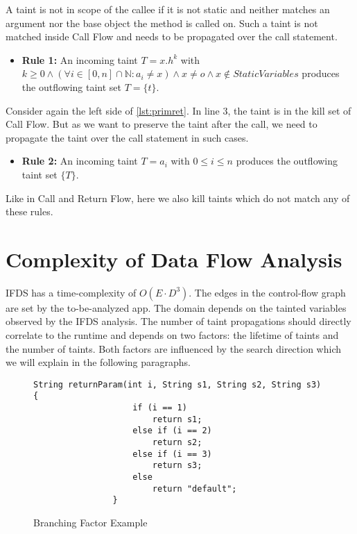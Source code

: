 \documentclass[../draft.tex]{subfiles}
\begin{document}
    A taint is not in scope of the callee if it is not static and neither matches an argument nor the base object the method is called on. Such a taint is not matched inside Call Flow and needs to be propagated over the call statement.
    \begin{itemize}
        \item[] \textbf{Rule 1:} An incoming taint $T = x.h^k$ with $k \geq 0 \land \left(\forall i \in [0, n] \cap \mathbb{N}: a_i \neq x\right) \land x \neq o \land x \notin \mathit{StaticVariables}$ produces the outflowing taint set $T = \{t\}$. 
    \end{itemize}

    Consider again the left side of \autoref{lst:primret}. In line 3, the taint is in the kill set of Call Flow. But as we want to preserve the taint after the call, we need to propagate the taint over the call statement in such cases. 
    \begin{itemize}
        \item[] \textbf{Rule 2:} An incoming taint $T = a_i$ with $0 \leq i \leq n$ produces the outflowing taint set $\{T\}$. 
    \end{itemize}
        
    Like in Call and Return Flow, here we also kill taints which do not match any of these rules.
    
    \section{Complexity of Data Flow Analysis}\label{s:complexity}
    IFDS has a time-complexity of $O(E \cdot D^3)$. The edges in the control-flow graph are set by the to-be-analyzed app. The domain depends on the tainted variables observed by the IFDS analysis. The number of taint propagations should directly correlate to the runtime and depends on two factors: the lifetime of taints and the number of taints. Both factors are influenced by the search direction which we will explain in the following paragraphs.

    \begin{figure}[ht]
        \centering
        \begin{adjustbox}{max width=\textwidth}
            \begin{lstlisting}[gobble=16]
                String returnParam(int i, String s1, String s2, String s3) {
                    if (i == 1)
                        return s1;
                    else if (i == 2)
                        return s2;
                    else if (i == 3)
                        return s3;
                    else
                        return "default";
                }
            \end{lstlisting}    
        \end{adjustbox}
        \caption{Branching Factor Example}
        \label{lst:branching}
    \end{figure}
\end{document}
